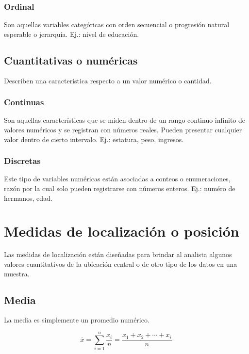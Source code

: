 \documentclass{report}
\begin{document}
        \subsubsection*{Ordinal} 
          Son aquellas variables categóricas con orden secuencial o progresión 
          natural esperable o jerarquía. Ej.: nivel de educación.

      \subsection*{Cuantitativas o numéricas}
        Describen una característica respecto a un valor numérico o cantidad.

        \subsubsection*{Continuas}
          Son aquellas características que se miden dentro de un rango continuo 
          infinito de valores numéricos y se registran con números reales. Pueden 
          presentar cualquier valor dentro de cierto intervalo. Ej.: estatura, 
          peso, ingresos.
        \subsubsection*{Discretas}
          Este tipo de variables numéricas están asociadas a conteos o enumeraciones, 
          razón por la cual solo pueden registrarse con números enteros. Ej.: numéro
          de hermanos, edad.
    \section*{Medidas de localización o posición}
      Las medidas de localización están diseñadas para brindar al analista algunos 
      valores cuantitativos de la ubicación central o de otro tipo de los datos en una 
      muestra.
      
      \subsection*{Media}
        La media es simplemente un promedio numérico.

        \begin{equation*}
          \overline{x}=\sum_{i = 1}^n\frac{x_i}{n}=\frac{x_1+x_2+\dotsm+x_i}{n}
        \end{equation*}
\end{document}
